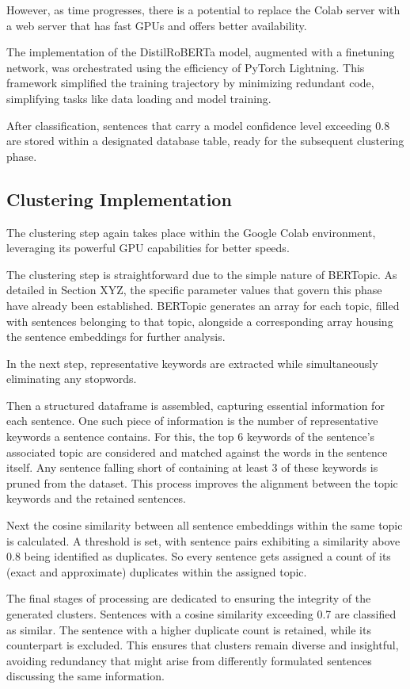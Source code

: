 \documentclass[a4paper,12pt]{report} %
\begin{document}
However, as time progresses, there is a potential to replace the Colab server with a web server that has fast GPUs and offers better availability.

The implementation of the DistilRoBERTa model, augmented with a finetuning network, was orchestrated using the efficiency of PyTorch Lightning. This framework simplified the training trajectory by minimizing redundant code, simplifying tasks like data loading and model training.

After classification, sentences that carry a model confidence level exceeding 0.8 are stored within a designated database table, ready for the subsequent clustering phase.

\subsection{Clustering Implementation}
The clustering step again takes place within the Google Colab environment, leveraging its powerful GPU capabilities for better speeds.

The clustering step is straightforward due to the simple nature of BERTopic. As detailed in Section XYZ, the specific parameter values that govern this phase have already been established. BERTopic generates an array for each topic, filled with sentences belonging to that topic, alongside a corresponding array housing the sentence embeddings for further analysis.

In the next step, representative keywords are extracted while simultaneously eliminating any stopwords.

Then a structured dataframe is assembled, capturing essential information for each sentence. One such piece of information is the number of representative keywords a sentence contains. For this, the top 6 keywords of the sentence's associated topic are considered and matched against the words in the sentence itself. Any sentence falling short of containing at least 3 of these keywords is pruned from the dataset. This process improves the alignment between the topic keywords and the retained sentences.

Next the cosine similarity between all sentence embeddings within the same topic is calculated. A threshold is set, with sentence pairs exhibiting a similarity above 0.8 being identified as duplicates. So every sentence gets assigned a count of its (exact and approximate) duplicates within the assigned topic.

The final stages of processing are dedicated to ensuring the integrity of the generated clusters. Sentences with a cosine similarity exceeding 0.7 are classified as similar. The sentence with a higher duplicate count is retained, while its counterpart is excluded. This ensures that clusters remain diverse and insightful, avoiding redundancy that might arise from differently formulated sentences discussing the same information.
\end{document}
